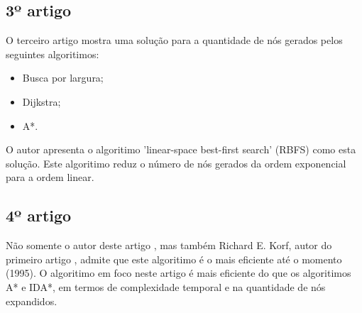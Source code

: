 \documentclass[a4paper]{article}
\begin{document}
\subsection{3º artigo}

O terceiro artigo \cite{Korf1993} mostra uma solução para a quantidade de nós gerados pelos
seguintes algoritimos:

\begin{itemize}

\item Busca por largura;
\item Dijkstra;
\item A*.

\end{itemize}

O autor apresenta o algoritimo 'linear-space best-first search' (RBFS) como esta solução. Este algoritimo reduz o número de nós gerados da ordem exponencial para a ordem linear.

\subsection{4º artigo}

Não somente o autor deste artigo \cite{Dillenburg1994}, mas também Richard E. Korf, autor do primeiro artigo \cite{Korf1995}, admite que este algoritimo é o mais eficiente até o momento (1995). O algoritimo em foco neste artigo é mais eficiente do que os algoritimos A* e IDA*, em termos de complexidade temporal e na quantidade de nós expandidos.





\end{document}
